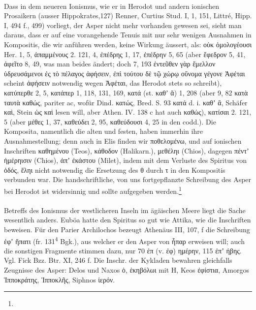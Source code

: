\paragraph{} Dass in dem neueren Ionismus, wie er in Herodot und andern
ionischen Prosaikern (ausser Hippokrates,127) Renner, Curtius Stud. I, 1, 151,
Littré, Hipp. I, 494 f., 499) vorliegt, der Asper nicht mehr vorhanden gewesen
sei, sieht man daraus, dass er auf eine vorangehende Tenuis mit nur sehr wenigen
Ausnahmen in Kompositis, die wir anführen werden, keine Wirkung äussert, als:
οὐκ ὁμολογέουσι Her. 1, 5, ἀπαμμένους 2. 121, 4, ἐπέδρης 1, 17, ἐπέδρην 5, 65
(aber ἔφεδρον 5, 41, ἀφεῖτο 8, 49, was man beides ändert; doch 7, 193 ἐντεῦθεν
γὰρ ἔμελλον ὑδρευσάμενοι ἐς τὸ πέλαγος ἀφήσειν, ἐπὶ τούτου δὲ τῷ χώρῳ οὔνομα
γέγονε Ἀφέται scheint ἀφήσειν notwendig wegen Ἀφέται, das Herodot stets so
schreibt), κατύπερθε 2, 5, κατάπερ 1, 118, 131, 169, κατά (st. καθʼ ἅ) 1, 208
(aber 9, 82 κατὰ ταυτὰ καθώς, pariter ac, wofür Dind. κατώς, Bred. S. 93 κατά d.
i. καθʼ ἃ, Schäfer καὶ, Stein ὡς καὶ lesen will, aber Athen. IV. 138 c hat auch
καθώς), κατίσαι 2. 121, 5 (aber μέθες 1, 37, καθεύδει 2, 95, καθεύδουσι 4, 25 in
den codd.). Die Komposita, namentlich die alten und festen, haben immerhin ihre
Ausnahmestellung; denn auch in Elis finden wir ποθελομένω, und auf ionischen
Inschriften καθημένου (Teos), κάθοδον (Halikarn.), μεθέληι (Chios), dagegen
πέντʼ ἠμέρηισιν (Chios), ἀπʼ ἐκάστου (Milet), indem mit dem Verluste des
Spiritus von ὁδός, ἕληι nicht notwendig die Ersetzung des θ durch τ in den
Kompositis verbunden war. Die handschriftliche, von uns fortgepflanzte
Schreibung des Asper bei Herodot ist widersinnig und sollte aufgegeben
werden.\footnote{}

\paragraph{} Betreffs des Ionismus der westlicheren Inseln im ägäischen Meere
liegt die Sache wesentlich anders. Euböa hatte den Spiritus so gut wie Attika,
wie die Inschriften beweisen. Für den Parier Archilochos bezeugt Athenäus III,
107, f die Schreibung ἐφʼ ἥπατι (fr. 131\textsuperscript{4} Bgk.), aus welcher
er den Asper von ἧπαρ erweisen will; auch die sonstigen Fragmente stimmen dazu,
nur 70 ἐπ (v.  ἐφ) ημέρην, 115 ἐπʼ ήβης. Vgl. Fick Bzz. Btr. XI, 246 f. Die
Inschr. der Kykladen bewahren gleichfalls Zeugnisse des Asper: Delos und Naxos
ὁ, ἑκηβόλωι mit H, Keos ἐφίστια, Amorgos Ἱπποκράτης, Ἱπποκλῆς, Siphnos ἱερόν. 

